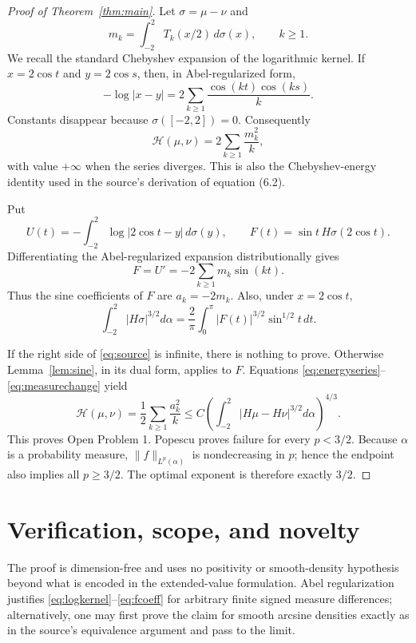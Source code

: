 \documentclass[11pt]{article}
\newcommand{\Hcal}{\mathcal H}
\begin{document}
\begin{proof}[Proof of Theorem~\ref{thm:main}]
Let $\sigma=\mu-\nu$ and
\[
 m_k=\int_{-2}^2T_k(x/2)\,d\sigma(x),\qquad k\geq1.
\]
We recall the standard Chebyshev expansion of the logarithmic kernel. If
$x=2\cos t$ and $y=2\cos s$, then, in Abel-regularized form,
\begin{equation}\label{eq:logkernel}
 -\log|x-y|
 =2\sum_{k\geq1}\frac{\cos(kt)\cos(ks)}{k}.
\end{equation}
Constants disappear because $\sigma([-2,2])=0$. Consequently
\begin{equation}\label{eq:energyseries}
 \Hcal(\mu,\nu)=2\sum_{k\geq1}\frac{m_k^2}{k},
\end{equation}
with value $+\infty$ when the series diverges.  This is also the
Chebyshev-energy identity used in the source's derivation of equation (6.2).

Put
\[
 U(t)=-\int_{-2}^2\log|2\cos t-y|\,d\sigma(y),
 \qquad F(t)=\sin t\,H\sigma(2\cos t).
\]
Differentiating the Abel-regularized expansion distributionally gives
\begin{equation}\label{eq:fcoeff}
 F=U'=-2\sum_{k\geq1}m_k\sin(kt).
\end{equation}
Thus the sine coefficients of $F$ are $a_k=-2m_k$. Also, under
$x=2\cos t$,
\begin{equation}\label{eq:measurechange}
 \int_{-2}^2|H\sigma|^{3/2}d\alpha
 =\frac2\pi\int_0^\pi|F(t)|^{3/2}\sin^{1/2}t\,dt.
\end{equation}

If the right side of \eqref{eq:source} is infinite, there is nothing to
prove. Otherwise Lemma~\ref{lem:sine}, in its dual form, applies to $F$.
Equations \eqref{eq:energyseries}--\eqref{eq:measurechange} yield
\[
 \Hcal(\mu,\nu)
 =\frac12\sum_{k\geq1}\frac{a_k^2}{k}
 \leq C
 \left(\int_{-2}^2|H\mu-H\nu|^{3/2}d\alpha\right)^{4/3}.
\]
This proves Open Problem 1. Popescu proves failure for every $p<3/2$.
Because $\alpha$ is a probability measure, $\|f\|_{L^p(\alpha)}$ is
nondecreasing in $p$; hence the endpoint also implies all $p\geq3/2$.
The optimal exponent is therefore exactly $3/2$.
\end{proof}

\section{Verification, scope, and novelty}

The proof is dimension-free and uses no positivity or smooth-density
hypothesis beyond what is encoded in the extended-value formulation. Abel
regularization justifies \eqref{eq:logkernel}--\eqref{eq:fcoeff} for arbitrary
finite signed measure differences; alternatively, one may first prove the
claim for smooth arcsine densities exactly as in the source's equivalence
argument and pass to the limit.
\end{document}
